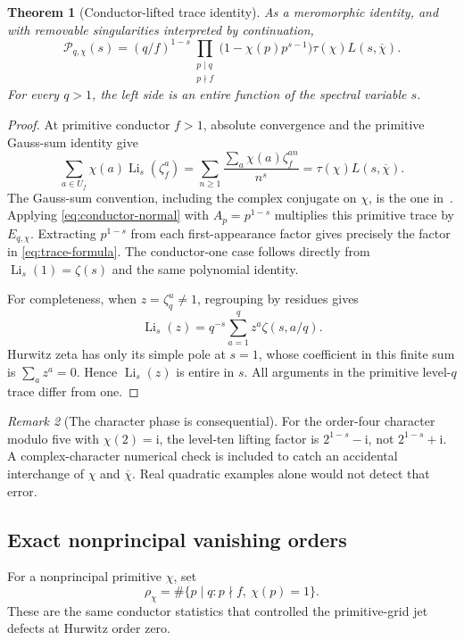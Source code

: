 \documentclass[11pt]{article}
\numberwithin{equation}{section}
\newtheorem{theorem}{Theorem}[section]
\theoremstyle{definition}
\theoremstyle{remark}
\newtheorem{remark}[theorem]{Remark}
\DeclareMathOperator{\Li}{Li}
\newcommand{\ii}{\mathrm i}
\newcommand{\cP}{\mathcal P}
\begin{document}
\begin{theorem}[Conductor-lifted trace identity]\label{thm:trace}
As a meromorphic identity, and with removable singularities interpreted
by continuation,
\begin{equation}\label{eq:trace-formula}
 \boxed{\displaystyle
 \cP_{q,\chi}(s)=
 (q/f)^{1-s}
 \prod_{\substack{p\mid q\\p\nmid f}}
 \bigl(1-\chi(p)p^{s-1}\bigr)
 \tau(\chi)L(s,\overline\chi).}
\end{equation}
For every $q>1$, the left side is an entire function of the spectral
variable $s$.
\end{theorem}
\begin{proof}
At primitive conductor $f>1$, absolute convergence and the primitive
Gauss-sum identity give
\[
 \sum_{a\in U_f}\chi(a)\Li_s(\zeta_f^a)
 =\sum_{n\ge1}\frac{\sum_a\chi(a)\zeta_f^{an}}{n^s}
 =\tau(\chi)L(s,\overline\chi).
\]
The Gauss-sum convention, including the complex conjugate on $\chi$,
is the one in~\cite{dlmf-dirichlet}. Applying
\eqref{eq:conductor-normal} with $A_p=p^{1-s}$ multiplies this
primitive trace by $E_{q,\chi}$. Extracting $p^{1-s}$ from each
first-appearance factor gives precisely the factor in
\eqref{eq:trace-formula}. The conductor-one case follows directly
from $\Li_s(1)=\zeta(s)$ and the same polynomial identity.

For completeness, when $z=\zeta_q^u\ne1$, regrouping by residues gives
\begin{equation}\label{eq:polylog-Hurwitz-DFT}
 \Li_s(z)=q^{-s}\sum_{a=1}^q z^a\zeta(s,a/q).
\end{equation}
Hurwitz zeta has only its simple pole at $s=1$, whose coefficient in
this finite sum is $\sum_a z^a=0$. Hence $\Li_s(z)$ is entire in $s$.
All arguments in the primitive level-$q$ trace differ from one.
\end{proof}

\begin{remark}[The character phase is consequential]
For the order-four character modulo five with $\chi(2)=\ii$, the
level-ten lifting factor is $2^{1-s}-\ii$, not
$2^{1-s}+\ii$. A complex-character numerical check is included to
catch an accidental interchange of $\chi$ and $\overline\chi$.
Real quadratic examples alone would not detect that error.
\end{remark}

\subsection{Exact nonprincipal vanishing orders}
For a nonprincipal primitive $\chi$, set
\[
 \rho_\chi=\#\{p\mid q:p\nmid f,\ \chi(p)=1\}.
\]
These are the same conductor statistics that controlled the
primitive-grid jet defects at Hurwitz order zero.
\end{document}
